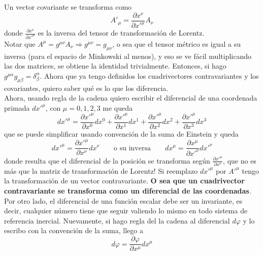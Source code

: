 \indent Un vector covariante se transforma como
\begin{equation}
    A'_{\mu} = \frac{\partial x^{\nu}}{\partial x'^{\mu}}A_{\nu}
        \label{ec:TrafoCovariante}
\end{equation}
donde $\frac{\partial x^{\nu}}{\partial x'^{\mu}}$ es la inversa del tensor de transformación de Lorentz.\\
\indent Notar que $A^{\mu} = g^{\mu\nu}A_{\nu} \Longrightarrow g^{\mu\nu} = g_{\mu\nu}$, o sea que el tensor métrico es igual a su inversa (para el espacio de Minkowski al menos), y eso se ve fácil multiplicando las dos matrices, se obtiene la identidad trivialmente. Entonces, si hago $g^{\mu\alpha}g_{\mu\beta} = \delta^{\alpha}_{\beta}$. Ahora que ya tengo definidos los cuadrivectores contravariantes y los covariantes, quiero saber qué es lo que los diferencia.\\
\indent Ahora, usando regla de la cadena quiero escribir el diferencial de una coordenada primada $dx'^{\mu}$, con $\mu = 0,1,2,3$ me queda
\begin{equation*}
    dx'^{\mu} = 
    \frac{\partial x'^{\mu}}{\partial x^{0}}dx^{0} + 
    \frac{\partial x'^{\mu}}{\partial x^{1}}dx^{1} + 
    \frac{\partial x'^{\mu}}{\partial x^{2}}dx^{2} + 
    \frac{\partial x'^{\mu}}{\partial x^{3}}dx^{3}
\end{equation*}
que se puede simplificar usando convención de la suma de Einstein y queda
\begin{equation*}
    dx'^{\mu} = \frac{\partial x'^{\mu}}{\partial x^{\nu}} dx^{\nu}
    \quad
    \quad
    \mbox{o su inversa}
    \quad
    \quad
    dx^{\mu} = \frac{\partial x^{\mu}}{\partial x'^{\nu}} dx'^{\nu}
\end{equation*}
donde resulta que el diferencial de la posición se transforma según $\frac{\partial x'^{\mu}}{\partial x^{\nu}}$, que no es más que la matriz de transformación de Lorentz! Si reemplazo $dx'^{\mu}$ por $A'^{\mu}$ tengo la transformación de un vector contravariante. \textbf{O sea que un cuadrivector contravariante se transforma como un diferencial de las coordenadas}.\\
\indent Por otro lado, el diferencial de una función escalar debe ser un invariante, es decir, cualquier número tiene que seguir valiendo lo mismo en todo sistema de referencia inercial. Nuevamente, si hago regla del la cadena al diferencial $d\varphi$ y lo escribo con la convención de la suma, llego a 
\begin{equation*}
    d\varphi = \frac{\partial \varphi}{\partial x^{\mu}}dx^{\mu}
\end{equation*}
